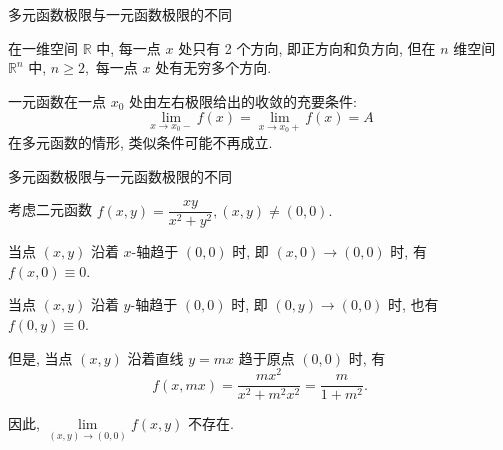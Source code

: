 
\begin{frame}{多元函数极限与一元函数极限的不同}

在一维空间 $\mathbb{R}$ 中, 每一点 $x$ 处只有 2 个方向, 即正方向和负方向, 但在 $n$ 维空间 $\mathbb{R}^n$ 中, $n \geqslant 2,$ 每一点 $x$ 处有无穷多个方向.

\pause

一元函数在一点 $x_0$ 处由左右极限给出的收敛的充要条件:
\[\lim\limits_{x \to x_0-} f(x) = \lim\limits_{x \to x_0+} f(x) = A\]
在多元函数的情形, 类似条件可能不再成立.

\end{frame}


\begin{frame}{多元函数极限与一元函数极限的不同}

\begin{eg}
考虑二元函数 $f(x, y) = \dfrac{xy}{x^2 + y^2}, (x, y) \neq (0, 0).$

\pause
\vspace{0.5em}

当点 $(x, y)$ 沿着 $x$-轴趋于 $(0, 0)$ 时, 即 $(x, 0) \to (0, 0)$ 时, 有 $f(x, 0) \equiv 0.$

当点 $(x, y)$ 沿着 $y$-轴趋于 $(0, 0)$ 时, 即 $(0, y) \to (0, 0)$ 时, 也有 $f(0, y) \equiv 0.$

\pause
\vspace{0.5em}

但是, 当点 $(x, y)$ 沿着直线 $y = mx$ 趋于原点 $(0, 0)$ 时, 有
\[f(x, mx) = \dfrac{mx^2}{x^2 + m^2 x^2} = \dfrac{m}{1+m^2}.\]

\pause

因此, $\lim\limits_{(x, y) \to (0, 0)} f(x, y)$ 不存在.
\end{eg}

\end{frame}



